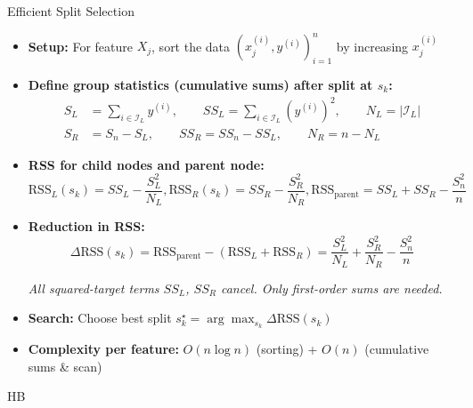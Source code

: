 \documentclass[10pt,compress,t,notes=noshow, xcolor=table]{beamer}
\begin{document}
\begin{frame}{Efficient Split Selection}
\begin{itemize}
  \item \textbf{Setup:} For feature \(X_j\), sort the data \((x_j^{(i)}, y^{(i)})_{i=1}^n\) by increasing \(x_j^{(i)}\)


  \item \textbf{Define group statistics (cumulative sums) after split at $s_k$:}
      \[
    \begin{aligned}
      S_L &= \textstyle\sum_{i \in \mathcal{I}_L} y^{(i)}, \qquad
      SS_L = \sum_{i \in \mathcal{I}_L} (y^{(i)})^2, \qquad
      N_L = |\mathcal{I}_L| \\
      S_R &= \textstyle S_n - S_L, \qquad
      SS_R = SS_n - SS_L, \qquad
      N_R = n - N_L
    \end{aligned}
    \]

  \item \textbf{RSS for child nodes and parent node:}
    \[
      \text{RSS}_L(s_k) = SS_L - \frac{S_L^2}{N_L}, 
      \text{RSS}_R(s_k) = SS_R - \frac{S_R^2}{N_R}, 
      \text{RSS}_{\text{parent}} = SS_L + SS_R - \frac{S_n^2}{n}
    \]
  \item<2-> \textbf{Reduction in RSS:}
    \[
      \Delta\text{RSS}(s_k) = \text{RSS}_{\text{parent}} - (\text{RSS}_L + \text{RSS}_R)
      = \frac{S_L^2}{N_L} + \frac{S_R^2}{N_R} - \frac{S_n^2}{n}
    \]

    \emph{All squared-target terms \( SS_L \), \( SS_R \) cancel. Only first-order sums are needed.}

  \item<2-> \textbf{Search:} Choose best split \(s_k^\star = \arg\max_{s_k} \Delta\text{RSS}(s_k)\)

  \item<2-> \textbf{Complexity per feature:}\; \(O(n\log n)\) (sorting) + \(O(n)\) (cumulative sums \& scan)
\end{itemize}
 HB\end{frame}
\end{document}
